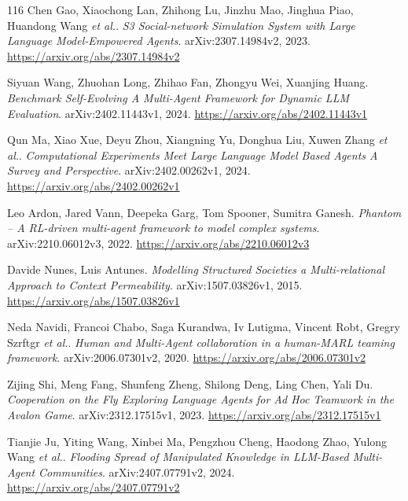 \documentclass[11pt,a4paper]{article}
\begin{document}
\begin{thebibliography}{116}
Chen Gao, Xiaochong Lan, Zhihong Lu, Jinzhu Mao, Jinghua Piao, Huandong Wang \emph{et al.}.
\newblock \emph{S3 Social-network Simulation System with Large Language Model-Empowered Agents}.
\newblock arXiv:2307.14984v2, 2023.
\newblock \url{https://arxiv.org/abs/2307.14984v2}

Siyuan Wang, Zhuohan Long, Zhihao Fan, Zhongyu Wei, Xuanjing Huang.
\newblock \emph{Benchmark Self-Evolving A Multi-Agent Framework for Dynamic LLM Evaluation}.
\newblock arXiv:2402.11443v1, 2024.
\newblock \url{https://arxiv.org/abs/2402.11443v1}

Qun Ma, Xiao Xue, Deyu Zhou, Xiangning Yu, Donghua Liu, Xuwen Zhang \emph{et al.}.
\newblock \emph{Computational Experiments Meet Large Language Model Based Agents A Survey and Perspective}.
\newblock arXiv:2402.00262v1, 2024.
\newblock \url{https://arxiv.org/abs/2402.00262v1}

Leo Ardon, Jared Vann, Deepeka Garg, Tom Spooner, Sumitra Ganesh.
\newblock \emph{Phantom -- A RL-driven multi-agent framework to model complex systems}.
\newblock arXiv:2210.06012v3, 2022.
\newblock \url{https://arxiv.org/abs/2210.06012v3}

Davide Nunes, Luis Antunes.
\newblock \emph{Modelling Structured Societies a Multi-relational Approach to Context Permeability}.
\newblock arXiv:1507.03826v1, 2015.
\newblock \url{https://arxiv.org/abs/1507.03826v1}

Neda Navidi, Francoi Chabo, Saga Kurandwa, Iv Lutigma, Vincent Robt, Gregry Szrftgr \emph{et al.}.
\newblock \emph{Human and Multi-Agent collaboration in a human-MARL teaming framework}.
\newblock arXiv:2006.07301v2, 2020.
\newblock \url{https://arxiv.org/abs/2006.07301v2}

Zijing Shi, Meng Fang, Shunfeng Zheng, Shilong Deng, Ling Chen, Yali Du.
\newblock \emph{Cooperation on the Fly Exploring Language Agents for Ad Hoc Teamwork in the Avalon Game}.
\newblock arXiv:2312.17515v1, 2023.
\newblock \url{https://arxiv.org/abs/2312.17515v1}

Tianjie Ju, Yiting Wang, Xinbei Ma, Pengzhou Cheng, Haodong Zhao, Yulong Wang \emph{et al.}.
\newblock \emph{Flooding Spread of Manipulated Knowledge in LLM-Based Multi-Agent Communities}.
\newblock arXiv:2407.07791v2, 2024.
\newblock \url{https://arxiv.org/abs/2407.07791v2}


\end{thebibliography}
\end{document}
